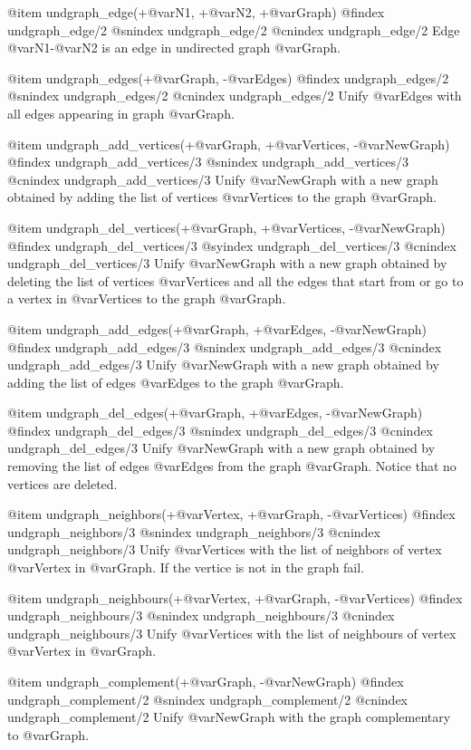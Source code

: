 {{{{{{{{{@item undgraph_edge(+@var{N1}, +@var{N2}, +@var{Graph})
@findex  undgraph_edge/2
@snindex undgraph_edge/2
@cnindex undgraph_edge/2
Edge @var{N1}-@var{N2} is an edge in undirected graph @var{Graph}.

@item undgraph_edges(+@var{Graph}, -@var{Edges})
@findex  undgraph_edges/2
@snindex undgraph_edges/2
@cnindex undgraph_edges/2
Unify @var{Edges} with all edges appearing in graph
@var{Graph}.

@item undgraph_add_vertices(+@var{Graph}, +@var{Vertices}, -@var{NewGraph})
@findex  undgraph_add_vertices/3
@snindex undgraph_add_vertices/3
@cnindex undgraph_add_vertices/3
Unify @var{NewGraph} with a new graph obtained by adding the list of
vertices @var{Vertices} to the graph @var{Graph}.

@item undgraph_del_vertices(+@var{Graph}, +@var{Vertices}, -@var{NewGraph})
@findex  undgraph_del_vertices/3
@syindex undgraph_del_vertices/3
@cnindex undgraph_del_vertices/3
Unify @var{NewGraph} with a new graph obtained by deleting the list of
vertices @var{Vertices} and all the edges that start from or go to a
vertex in @var{Vertices} to the graph @var{Graph}.

@item undgraph_add_edges(+@var{Graph}, +@var{Edges}, -@var{NewGraph})
@findex  undgraph_add_edges/3
@snindex undgraph_add_edges/3
@cnindex undgraph_add_edges/3
Unify @var{NewGraph} with a new graph obtained by adding the list of
edges @var{Edges} to the graph @var{Graph}.

@item undgraph_del_edges(+@var{Graph}, +@var{Edges}, -@var{NewGraph})
@findex  undgraph_del_edges/3
@snindex undgraph_del_edges/3
@cnindex undgraph_del_edges/3
Unify @var{NewGraph} with a new graph obtained by removing the list of
edges @var{Edges} from the graph @var{Graph}. Notice that no vertices
are deleted.

@item undgraph_neighbors(+@var{Vertex}, +@var{Graph}, -@var{Vertices})
@findex  undgraph_neighbors/3
@snindex undgraph_neighbors/3
@cnindex undgraph_neighbors/3
Unify @var{Vertices} with the list of neighbors of vertex @var{Vertex}
in @var{Graph}. If the vertice is not in the graph fail.

@item undgraph_neighbours(+@var{Vertex}, +@var{Graph}, -@var{Vertices})
@findex  undgraph_neighbours/3
@snindex undgraph_neighbours/3
@cnindex undgraph_neighbours/3
Unify @var{Vertices} with the list of neighbours of vertex @var{Vertex}
in @var{Graph}.

@item undgraph_complement(+@var{Graph}, -@var{NewGraph})
@findex  undgraph_complement/2
@snindex undgraph_complement/2
@cnindex undgraph_complement/2
Unify @var{NewGraph} with the graph complementary to @var{Graph}.

}}}}}}}}}
